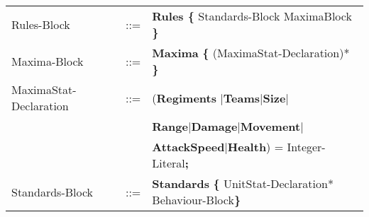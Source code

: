 \begin{center}
\begin{longtable}{ l l l }
	Rules-Block					&	::=	&{\bf Rules \{ }Standards-Block MaximaBlock	{\bf \} }	\\
	Maxima-Block				&	::=	&{\bf Maxima} {\bf \{} (MaximaStat-Declaration)* {\bf \}}\\
	MaximaStat-Declaration	&	::=	&({\bf Regiments }$\mid${\bf Teams}$\mid${\bf Size}$\mid$\\
								&		&{\bf Range}$\mid${\bf Damage}$\mid${\bf Movement}$\mid$\\
								&		&{\bf AttackSpeed}$\mid${\bf Health}) =  Integer-Literal{\bf ;}\\
	Standards-Block				&	::=	&{\bf Standards} {\bf \{ } UnitStat-Declaration* Behaviour-Block\bf{\} }		\\
\end{longtable}
\end{center}	


